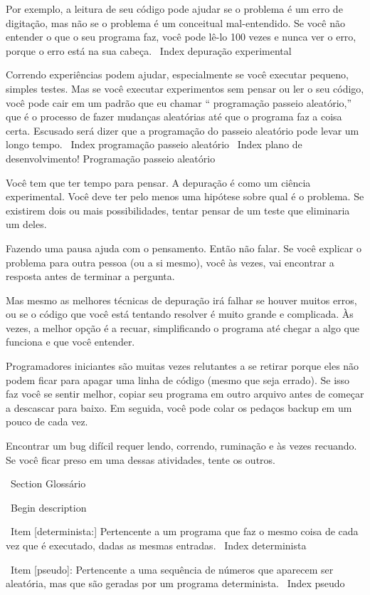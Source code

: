 \documentclass[10pt]{book}
\begin{document}
\begin {itemize}
{{{{{{{{{{Por exemplo, a leitura de seu código pode ajudar se o problema é um
erro de digitação, mas não se o problema é um conceitual
mal-entendido. Se você não entender o que o seu programa faz, você
pode lê-lo 100 vezes e nunca ver o erro, porque o erro está na
sua cabeça.
\ Index {depuração experimental}

Correndo experiências podem ajudar, especialmente se você executar pequeno, simples
testes. Mas se você executar experimentos sem pensar ou ler o seu
código, você pode cair em um padrão que eu chamar `` programação passeio aleatório,''
que é o processo de fazer mudanças aleatórias até que o programa
faz a coisa certa. Escusado será dizer que a programação do passeio aleatório
pode levar um longo tempo.
\ Index {programação passeio aleatório}
\ Index {plano de desenvolvimento! Programação passeio aleatório}

Você tem que ter tempo para pensar. A depuração é como um
ciência experimental. Você deve ter pelo menos uma hipótese sobre
qual é o problema. Se existirem dois ou mais possibilidades, tentar
pensar de um teste que eliminaria um deles.

Fazendo uma pausa ajuda com o pensamento. Então não falar.
Se você explicar o problema para outra pessoa (ou a si mesmo), você
às vezes, vai encontrar a resposta antes de terminar a pergunta.

Mas mesmo as melhores técnicas de depuração irá falhar se houver muitos
erros, ou se o código que você está tentando resolver é muito grande e
complicada. Às vezes, a melhor opção é a recuar, simplificando o
programa até chegar a algo que funciona e que você
entender.

Programadores iniciantes são muitas vezes relutantes a se retirar porque
eles não podem ficar para apagar uma linha de código (mesmo que seja errado).
Se isso faz você se sentir melhor, copiar seu programa em outro arquivo
antes de começar a descascar para baixo. Em seguida, você pode colar os pedaços
backup em um pouco de cada vez.

Encontrar um bug difícil requer lendo, correndo, ruminação e
às vezes recuando. Se você ficar preso em uma dessas atividades,
tente os outros.


\ Section {} Glossário

\ Begin {description}

\ Item [determinista:] Pertencente a um programa que faz o mesmo
coisa de cada vez que é executado, dadas as mesmas entradas.
\ Index {} determinista

\ Item [pseudo]: Pertencente a uma sequência de números que aparecem
ser aleatória, mas que são geradas por um programa determinista.
\ Index {pseudo}

}}}}}}}}}}
\end{itemize}
\end{document}
